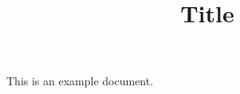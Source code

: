 \documentclass[11pt, letterpaper]{article}
\title{Title}
\begin{document}
\clearpage
\maketitle
This is an example document. \cite{lee2001nmf}

\end{document}
